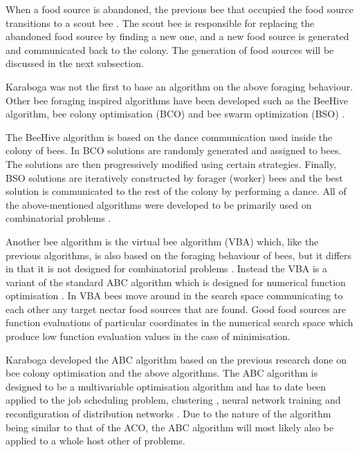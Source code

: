When a food source is abandoned, the previous bee that occupied the food source transitions to a scout bee \cite{ABCCompareStudy,ABCNumericalOptimization}. The scout bee is responsible for replacing the abandoned food source by finding a new one, and a new food source is generated and communicated back to the colony\cite{ABCCompareStudy,ABCImageEnhancement,ABCNumericalOptimization}. The generation of food sources will be discussed in the next subsection.

Karaboga was not the first to base an algorithm on the above foraging behaviour. Other bee foraging inspired algorithms have been developed such as the BeeHive algorithm, bee colony optimisation (BCO) and bee swarm optimization (BSO) \cite{BCO,HybridABCClustering,ABCNumericalOptimization}. 

The BeeHive algorithm is based on the dance communication used inside the colony of bees. In BCO solutions are randomly generated and assigned to bees\cite{HybridABCClustering,ABCNumericalOptimization}. The solutions are then progressively modified using certain strategies. Finally, BSO solutions are iteratively constructed by forager (worker) bees and the best solution is communicated to the rest of the colony by performing a dance\cite{HybridABCClustering,ABCNumericalOptimization}. All of the above-mentioned algorithms were developed to be primarily used on combinatorial problems \cite{ABCCompareStudy}.

Another bee algorithm is the virtual bee algorithm (VBA) which, like the previous algorithms, is also based on the foraging behaviour of bees, but it differs in that it is not designed for combinatorial problems \cite{ABCNumericalOptimization}. Instead the VBA is a variant of the standard ABC algorithm which is designed for numerical function optimisation \cite{ABCNumericalOptimization}. In VBA bees move around in the search space communicating to each other any target nectar food sources that are found\cite{ABCNumericalOptimization}. Good food sources are function evaluations of particular coordinates in the numerical search space which produce low function evaluation values in the case of minimisation\cite{ABCNumericalOptimization}.

Karaboga developed the ABC algorithm based on the previous research done on bee colony optimisation and the above algorithms. The ABC algorithm is designed to be a multivariable optimisation algorithm and has to date been applied to the job scheduling problem, clustering \cite{HybridABCClustering}, neural network training and reconfiguration of distribution networks \cite{ABCReconfigDistro}. Due to the nature of the algorithm being similar to that of the ACO, the ABC algorithm will most likely also be applied to a whole host other of problems.

